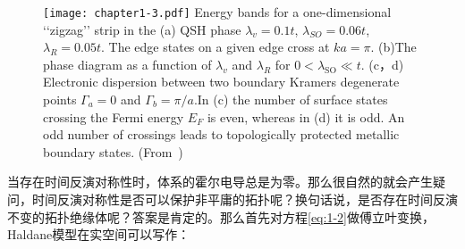 \begin{figure}[!t]
    \centering
    \texttt{[image: chapter1-3.pdf]}
    { Energy bands for a one-dimensional ‘‘zigzag’’ strip in the (a) QSH phase $\lambda_v=0.1 t$, $\lambda_{SO}=0.06 t$, $\lambda_{R}=0.05 t$. The edge states on a given edge cross at $ka=\pi$. (b)The phase diagram as a function of $\lambda_v$ and $\lambda_R$ for $0 < \lambda_{\mathrm{SO}} \ll t$. (c，d) Electronic dispersion between two boundary Kramers degenerate points $\Gamma_a=0$ and $\Gamma_b=\pi/a$.In (c) the number of surface states crossing the Fermi energy $E_F$ is even, whereas in (d) it is odd. An odd number of crossings leads to topologically protected metallic boundary states. (From~\citep{kane2,TIreview,Fu2007topo})}
    \label{fig:1-3}
\end{figure}

当存在时间反演对称性时，体系的霍尔电导总是为零。那么很自然的就会产生疑问，时间反演对称性是否可以保护非平庸的拓扑呢？换句话说，是否存在时间反演不变的拓扑绝缘体呢？答案是肯定的。那么首先对方程\ref{eq:1-2}做傅立叶变换，Haldane模型在实空间可以写作：

